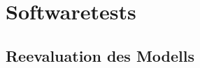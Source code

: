 \chapter{Softwaretests} \label{chap:softwaretests}

\section{Reevaluation des Modells} \label{sec:newmodel}